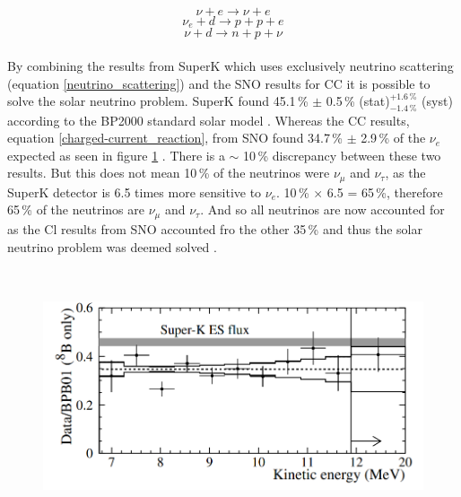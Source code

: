 \begin{equation}
    \nu + e \rightarrow  \nu + e
    \label{neutrino_scattering}
\end{equation}
\begin{equation}
    \nu_e + d \rightarrow p + p + e 
    \label{charged-current_reaction}
\end{equation}
\begin{equation}
    \nu + d \rightarrow  n + p + \nu
    \label{neutral-current_reaction}
\end{equation}
\\By combining the results from SuperK which uses exclusively neutrino scattering (equation \ref{neutrino_scattering}) and the SNO results for CC it is possible to solve the solar neutrino problem. SuperK found 45.1\,\% $\pm$ 0.5\,\% (stat)$^{+1.6\,\%}_{-1.4\,\%}$ (syst) according to the BP2000 standard solar model \cite{superK2001}. Whereas the CC results, equation \ref{charged-current_reaction}, from SNO found 34.7\,\% $\pm$ 2.9\,\% of the $\nu_e$ expected as seen in figure \ref{sno_superK_comparision_plot} \cite{sno2001}. There is a $\sim$ 10\,\% discrepancy between these two results. But this does not mean 10\,\% of the neutrinos were $\nu_\mu$ and $\nu_\tau$, as the SuperK detector is 6.5 times more sensitive to $\nu_e$. 10\,\% $\times$ 6.5 = 65\,\%, therefore 65\,\% of the neutrinos are $\nu_\mu$ and $\nu_\tau$. And so all neutrinos are now accounted for as the Cl results from SNO accounted fro the other 35\,\% and thus the solar neutrino problem was deemed solved \cite{griffiths2008book} \cite{griffiths2008neutrinoOscillations}.


\begin{figure}[htbp]
 \centering
 \includegraphics[height=75mm]{Chapter1/Figs/Raster/superKSnoComparison.png} %
 \label{sno_superK_comparision_plot}
\end{figure}


